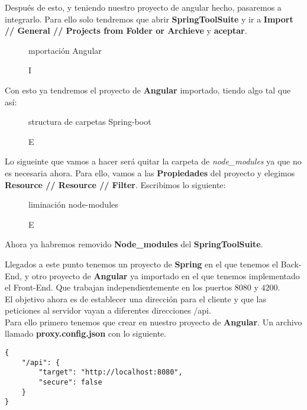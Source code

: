 \documentclass[12pt,a4paper]{article}
\begin{document}
Después de esto, y teniendo nuestro proyecto de angular hecho, pasaremos a integrarlo. Para ello solo tendremos que abrir \textbf{SpringToolSuite} y ir a \textbf{Import // General // Projects from Folder or Archieve} y \textbf{aceptar}.\\

\begin{figure}[!h]
\centering
{}
\caption Importación Angular
\label{itg1}
\end{figure}

\newpage

Con esto ya tendremos el proyecto de \textbf{Angular} importado, tiendo algo tal que así:

\begin{figure}[!h]
\centering
{}
\caption Estructura de carpetas Spring-boot
\label{itg2}
\end{figure}


Lo sigueinte que vamos a hacer será quitar la carpeta de \textit{node\_modules} ya que no es necesaria ahora. Para ello, vamos a las \textbf{Propiedades} del proyecto y elegimos \textbf{Resource // Resource  // Filter}. Escribimos lo siguiente:


\begin{figure}[!h]
\centering
{}
\caption Eliminación node-modules
\label{itg3}
\end{figure}

Ahora ya habremos removido \textbf{Node\_modules} del \textbf{SpringToolSuite}.


Llegados a este punto tenemos un proyecto de \textbf{Spring} en el que tenemos el Back-End, y otro proyecto de \textbf{Angular} ya importado en el que tenemos implementado el Front-End. Que trabajan independientemente en los puertos $8080$ y $4200$.\\

El objetivo ahora es de establecer una dirección para el cliente y que las peticiones al servidor vayan a diferentes direcciones /api.\\

Para ello primero tenemos que crear en nuestro proyecto de \textbf{Angular}. Un archivo llamado \textbf{proxy.config.json} con lo siguiente.

\begin{verbatim}
{
	"/api": {
		"target": "http://localhost:8080",
		"secure": false
	}
}
    
\end{verbatim}
\end{document}
